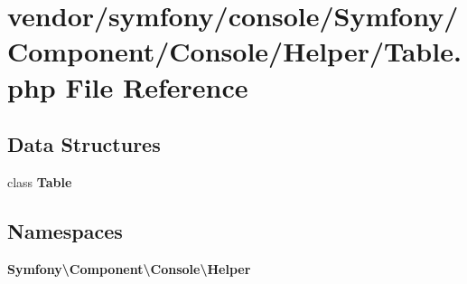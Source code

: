 \section{vendor/symfony/console/\+Symfony/\+Component/\+Console/\+Helper/\+Table.php File Reference}
\label{_table_8php}
\subsection*{Data Structures}
\begin{DoxyCompactItemize}
\item 
class {\bf Table}
\end{DoxyCompactItemize}
\subsection*{Namespaces}
\begin{DoxyCompactItemize}
\item 
 {\bf Symfony\textbackslash{}\+Component\textbackslash{}\+Console\textbackslash{}\+Helper}
\end{DoxyCompactItemize}
